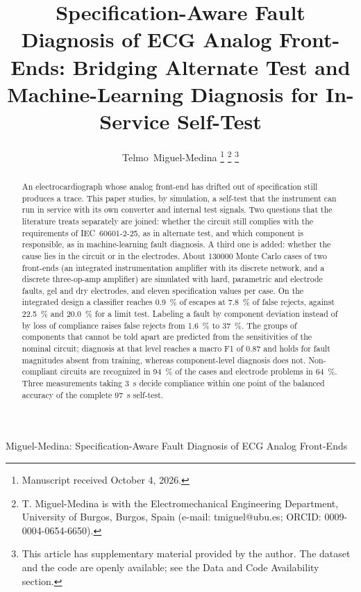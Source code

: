 \documentclass[lettersize,journal]{IEEEtran}
\begin{document}
\title{Specification-Aware Fault Diagnosis of ECG Analog Front-Ends: Bridging Alternate Test and
Machine-Learning Diagnosis for In-Service Self-Test}

\author{Telmo~Miguel-Medina%
\thanks{Manuscript received October 4, 2026.}%
\thanks{T. Miguel-Medina is with the Electromechanical Engineering Department, University of
Burgos, Burgos, Spain (e-mail: tmiguel@ubu.es; ORCID: 0009-0004-0654-6650).}%
\thanks{This article has supplementary material provided by the author. The dataset and the code
are openly available; see the Data and Code Availability section.}}

%
{Miguel-Medina: Specification-Aware Fault Diagnosis of ECG Analog Front-Ends}

\maketitle

\begin{abstract}
An electrocardiograph whose analog front-end has drifted out of specification still produces a
trace. This paper studies, by simulation, a self-test that the instrument can run in service with its own converter and
internal test signals. Two questions that the literature treats separately are joined: whether
the circuit still complies with the requirements of IEC~60601-2-25, as in alternate test, and
which component is responsible, as in machine-learning fault diagnosis. A third one is added:
whether the cause lies in the circuit or in the electrodes. About \num{130000} Monte Carlo cases
of two front-ends (an integrated instrumentation amplifier with its discrete network, and a
discrete three-op-amp amplifier) are simulated with hard, parametric and electrode faults, gel
and dry electrodes, and eleven specification values per case. On the integrated design a
classifier reaches \SI{0.9}{\percent} of escapes at \SI{7.8}{\percent} of false rejects, against
\SI{22.5}{\percent} and \SI{20.0}{\percent} for a limit test. Labeling a fault by component
deviation instead of by loss of compliance raises false rejects from \SI{1.6}{\percent} to
\SI{37}{\percent}. The groups of components that cannot be told apart are predicted from the
sensitivities of the nominal circuit; diagnosis at that level reaches a macro F1 of 0.87 and
holds for fault magnitudes absent from training, whereas component-level diagnosis does not.
Non-compliant circuits are recognized in \SI{94}{\percent} of the cases and electrode problems in
\SI{64}{\percent}. Three measurements taking \SI{3}{\second} decide compliance within one point
of the balanced accuracy of the complete \SI{97}{\second} self-test.
\end{abstract}
\end{document}
